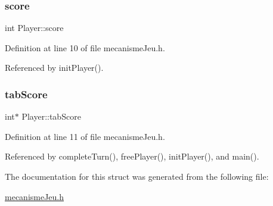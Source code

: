 \mbox{\label{structPlayer_ace6abae8d66534ad0a1fd6458f786a6e}} 
\subsubsection{\texorpdfstring{score}{score}}
{\footnotesize\ttfamily int Player\+::score}



Definition at line 10 of file mecanisme\+Jeu.\+h.



Referenced by init\+Player().

\mbox{\label{structPlayer_a7d5c0f37c78c868e4721cc8ceece92a6}} 
\subsubsection{\texorpdfstring{tab\+Score}{tabScore}}
{\footnotesize\ttfamily int$\ast$ Player\+::tab\+Score}



Definition at line 11 of file mecanisme\+Jeu.\+h.



Referenced by complete\+Turn(), free\+Player(), init\+Player(), and main().



The documentation for this struct was generated from the following file\+:\begin{DoxyCompactItemize}
\item 
\hyperlink{mecanismeJeu_8h}{mecanisme\+Jeu.\+h}\end{DoxyCompactItemize}
